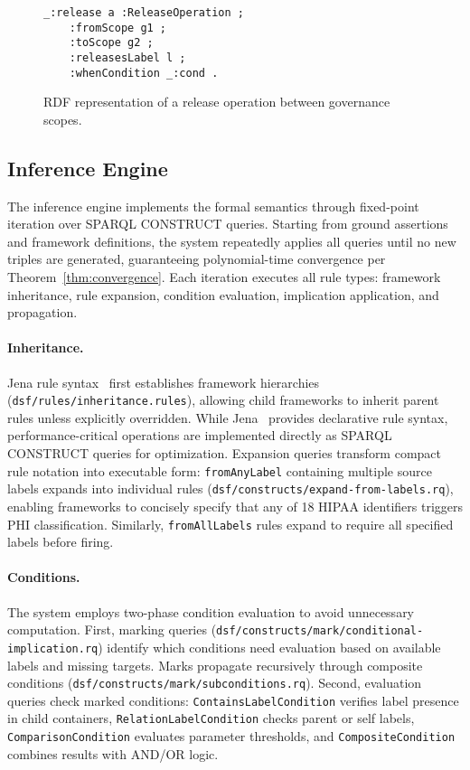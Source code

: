 \documentclass{IOS-Book-Article}
\begin{document}
\begin{figure}[ht]
\begin{lstlisting}[basicstyle=\ttfamily, frame=none]
_:release a :ReleaseOperation ;
    :fromScope g1 ;
    :toScope g2 ;
    :releasesLabel l ;
    :whenCondition _:cond .
\end{lstlisting}
\caption{RDF representation of a release operation between governance scopes.}
\label{fig:appendix-release-op}
\end{figure}

\subsection{Inference Engine}\label{sec:appendix-inference}

The inference engine implements the formal semantics through fixed-point iteration over SPARQL CONSTRUCT queries. Starting from ground assertions and framework definitions, the system repeatedly applies all queries until no new triples are generated, guaranteeing polynomial-time convergence per Theorem~\ref{thm:convergence}. Each iteration executes all rule types: framework inheritance, rule expansion, condition evaluation, implication application, and propagation.

\paragraph{Inheritance.}
Jena rule syntax~\cite{jena} first establishes framework hierarchies (\texttt{dsf/rules/inheritance.rules}), allowing child frameworks to inherit parent rules unless explicitly overridden. While Jena~\cite{jena} provides declarative rule syntax, performance-critical operations are implemented directly as SPARQL CONSTRUCT queries for optimization. Expansion queries transform compact rule notation into executable form: \texttt{fromAnyLabel} containing multiple source labels expands into individual rules (\texttt{dsf/constructs/expand-from-labels.rq}), enabling frameworks to concisely specify that any of 18 HIPAA identifiers triggers PHI classification. Similarly, \texttt{fromAllLabels} rules expand to require all specified labels before firing.

\paragraph{Conditions.}
The system employs two-phase condition evaluation to avoid unnecessary computation. First, marking queries (\texttt{dsf/constructs/mark/conditional-implication.rq}) identify which conditions need evaluation based on available labels and missing targets. Marks propagate recursively through composite conditions (\texttt{dsf/constructs/mark/subconditions.rq}). Second, evaluation queries check marked conditions: \texttt{ContainsLabelCondition} verifies label presence in child containers, \texttt{RelationLabelCondition} checks parent or self labels, \texttt{ComparisonCondition} evaluates parameter thresholds, and \texttt{CompositeCondition} combines results with AND/OR logic.
\end{document}
